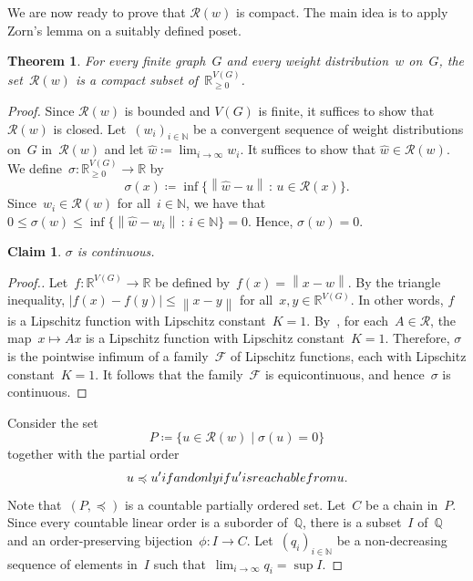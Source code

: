 \documentclass[reqno, 12pt]{amsart}
\numberwithin{equation}{section}
\numberwithin{figure}{section}
\theoremstyle{plain}
\newtheorem{theorem}[thm]{Theorem}
\newtheorem*{claim*}{Claim}
\theoremstyle{definition}
\newenvironment{subproof}[1][Proof.]{%
    \begin{proof}[{#1}]%
        \renewcommand*{\qedsymbol}{\scalebox{1.2}{$\square$}}}{%
    \end{proof}}
\renewcommand{\preceq}{\preccurlyeq}
\newcommand*{\abs}[1]{\ensuremath{{\left\lvert {#1} \right\rvert}}}
\newcommand{\norm}[1]{\ensuremath{\left\lVert {#1} \right\rVert}}
\begin{document}
We are now ready to prove that $\mathcal{R}(w)$ is compact. The main idea is to apply Zorn's lemma on a suitably defined poset.  

\begin{theorem}
    \label{thm:compactness}
    For every finite graph~$G$ and every weight distribution~$w$ on~$G$, the set~$\mathcal{R}(w)$ is a compact subset of~$\mathbb{R}_{\geq 0}^{V(G)}$. 
\end{theorem}

\begin{proof} 
    Since $\mathcal{R}(w)$ is bounded and $V(G)$ is finite, it suffices to show that $\mathcal{R}(w)$ is closed. 
    Let~$(w_i)_{i \in \mathbb{N}}$ be a convergent sequence of weight distributions on~$G$ in~$\mathcal{R}(w)$ and let ${\hat{w} \coloneqq \lim_{i \to \infty} w_i}$. It suffices to show that $\hat{w} \in \mathcal{R}(w)$.  
    We define~${\sigma \colon \mathbb{R}_{\geq 0}^{V(G)}} \to \mathbb{R}$ by
    \[
        \sigma(x) \coloneqq \inf \big\{ \norm{\hat{w} - u} \,\colon\, u \in \mathcal{R}(x) \big\}. 
    \]
    Since~${w_i \in \mathcal{R}(w)}$ for all~${i \in \mathbb{N}}$, we have that~${0 \leq \sigma(w) \leq \inf \{ \norm{\hat{w} - w_i} \,\colon\, i \in \mathbb{N} \} = 0}$.  Hence, ${\sigma(w) = 0}$. 
    \begin{claim*}
        $\sigma$ is continuous.
    \end{claim*}
    
    \begin{subproof}
        Let~${f \colon \mathbb{R}^{V(G)} \to \mathbb{R}}$ be defined by~${f(x) = \norm{x-\hat{w}}}$. 
        By the triangle inequality, $\abs{f(x)-f(y)} \leq \norm{x-y}$ for all~${x,y \in \mathbb{R}^{V(G)}}$. 
        In other words, $f$ is a Lipschitz function with Lipschitz constant~${K = 1}$. 
        By~, for each~${A \in \mathcal{R}}$, the map~${x \mapsto Ax}$ is a Lipschitz function with Lipschitz constant~${K = 1}$. 
        Therefore, $\sigma$ is the pointwise infimum of a family~$\mathcal{F}$ of Lipschitz functions, each with Lipschitz constant~${K = 1}$. 
        It follows that the family~$\mathcal{F}$ is equicontinuous, and hence~$\sigma$ is continuous. 
    \end{subproof}
    
    Consider the set 
    \[
        P \coloneqq \{ u \in \mathcal{R}(w)  \mid \sigma(u) = 0 \}
    \]
    together with the partial order
    \[
        u \preceq u' \textnormal{ if and only if } u' \textnormal{ is reachable from } u.
    \]
    Note that~${(P, \preceq)}$ is a countable partially ordered set. 
    Let~$C$ be a chain in~$P$. 
    Since every countable linear order is a suborder of~$\mathbb{Q}$, there is a subset~$I$ of~$\mathbb{Q}$ and an order-preserving bijection~${\phi \colon I \to C}$. 
    Let~${(q_i)_{i \in \mathbb{N}}}$ be a non-decreasing sequence of elements in~$I$ such that~${\lim_{i \to \infty} q_i = \sup I}$.    
    

\end{proof}
\end{document}
